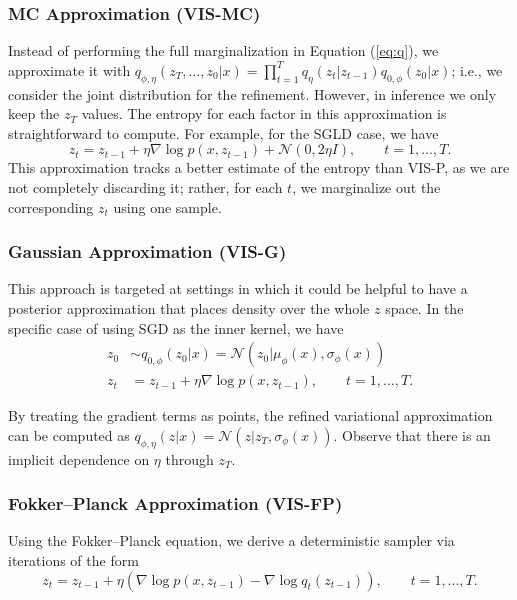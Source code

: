     \subsubsection{MC Approximation (VIS-MC)}
     Instead of performing the full marginalization in Equation (\ref{eq:q}), we approximate it with  { $q_{\phi,\eta}(z_T,\ldots, z_0|x) = \prod_{t=1}^T q_\eta(z_t | z_{t-1}) q_{0,\phi}(z_0|x)$; i.e., we consider the joint distribution for the refinement. However, in inference we only keep the $z_T$ values}. The entropy for each factor in this 
    approximation is straightforward to compute. For 
    example, for the SGLD case, we have
    {\bf
    $$ 
    z_t = z_{t-1} + \eta \nabla \log p(x, z_{t-1}) + \mathcal{N}(0, 2\eta I),\qquad  t=1, ..., T.
    $$
    }
This approximation tracks a better estimate of the entropy than 
    VIS-P, as we are not completely discarding it; rather, for each $t$, we marginalize out the corresponding $z_t$ using one sample.
          \subsubsection{Gaussian Approximation (VIS-G)} 
          This approach is targeted at settings in which it could be helpful to have a posterior approximation that places density over the whole
        $z$ space. In the specific case of using SGD as the inner kernel, we have
\begin{align*}
z_0 &\sim q_{0,\phi}(z_0|x) = \mathcal{N}(z_0 | \mu_\phi(x), \sigma_\phi(x))\\
z_t &= z_{t-1} + \eta \nabla \log p(x, z_{t-1}), \qquad t=1,\ldots,T.
\end{align*}

By treating the gradient terms as points, the refined variational approximation can be computed as
$ q_{\phi,\eta}(z|x) = \mathcal{N}(z | z_T, \sigma_\phi(x))$. Observe 
that there is an implicit dependence on $\eta$ through $z_T$.

    
      \subsubsection{Fokker--Planck Approximation (VIS-FP)} 
      Using the Fokker--Planck equation, we derive 
    a deterministic sampler via iterations of the form
\begin{equation*}
z_{t} = z_{t-1} + \eta (\nabla \log p(x, z_{t-1}) - \nabla \log q_t (z_{t-1})),\qquad  t=1, ..., T{.}
\end{equation*}

